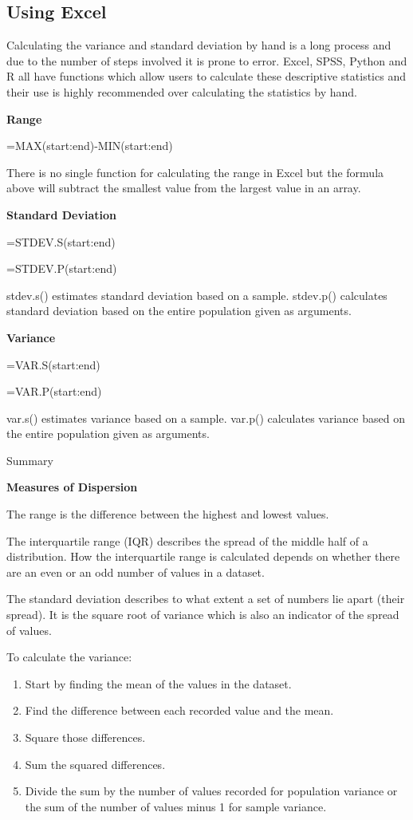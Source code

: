 \documentclass[
]{book}
\providecommand{\tightlist}{%
  \setlength{\itemsep}{0pt}\setlength{\parskip}{0pt}}
\begin{document}
\hypertarget{using-excel-1}{%
\subsection{Using Excel}\label{using-excel-1}}

Calculating the variance and standard deviation by hand is a long process and due to the number of steps involved it is prone to error. Excel, SPSS, Python and R all have functions which allow users to calculate these descriptive statistics and their use is highly recommended over calculating the statistics by hand.

\textbf{Range}

=MAX(start:end)-MIN(start:end)

There is no single function for calculating the range in Excel but the formula above will subtract the smallest value from the largest value in an array.

\textbf{Standard Deviation}

=STDEV.S(start:end)

=STDEV.P(start:end)

stdev.s() estimates standard deviation based on a sample. stdev.p() calculates standard deviation based on the entire population given as arguments.

\textbf{Variance}

=VAR.S(start:end)

=VAR.P(start:end)

var.s() estimates variance based on a sample. var.p() calculates variance based on the entire population given as arguments.

Summary

\textbf{Measures of Dispersion}

The range is the difference between the highest and lowest values.

The interquartile range (IQR) describes the spread of the middle half of a distribution. How the interquartile range is calculated depends on whether there are an even or an odd number of values in a dataset.

The standard deviation describes to what extent a set of numbers lie apart (their spread). It is the square root of variance which is also an indicator of the spread of values.

To calculate the variance:

\begin{enumerate}
\def\labelenumi{\arabic{enumi}.}
\tightlist
\item
  Start by finding the mean of the values in the dataset.
\item
  Find the difference between each recorded value and the mean.
\item
  Square those differences.
\item
  Sum the squared differences.
\item
  Divide the sum by the number of values recorded for population variance or the sum of the number of values minus 1 for sample variance.
\end{enumerate}
\end{document}
